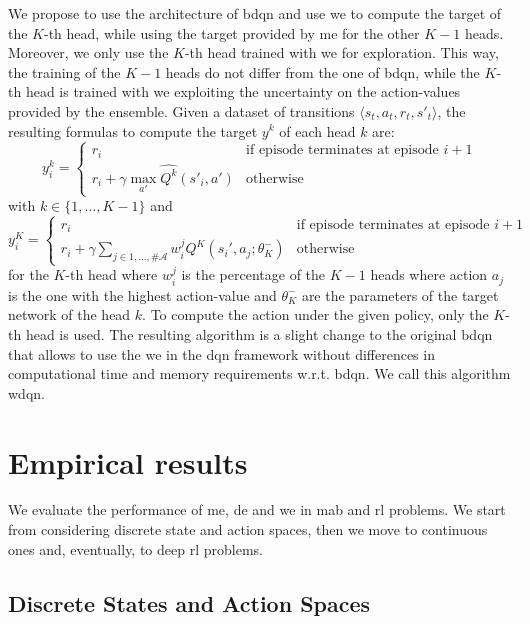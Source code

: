 We propose to use the architecture of \gls{bdqn} and use \gls{we} to compute the target of the $K$-th head, while using the target provided by \gls{me} for the other $K-1$ heads. Moreover, we only use the $K$-th head trained with \gls{we} for exploration. This way, the training of the $K-1$ heads do not differ from the one of \gls{bdqn}, while the $K$-th head is trained with \gls{we} exploiting the uncertainty on the action-values provided by the ensemble. Given a dataset of transitions $\langle s_t, a_t, r_t, s'_t \rangle$, the resulting formulas to compute the target $y^k$ of each head $k$ are:
\begin{equation}\label{E:dqn_update1}
y_i^k=
    \begin{cases}
    r_i & \text{if episode terminates at episode }i+1\\
    r_i + \gamma \max_{a'} \hat{Q^k}(s'_i, a') & \text{otherwise}
    \end{cases}
\end{equation}
with $k \in \lbrace 1, \dots, K-1 \rbrace$ and
\begin{equation}\label{E:dqn_update2}
y_i^K=
    \begin{cases}
    r_i & \text{if episode terminates at episode }i+1\\
    r_i + \gamma \sum_{j \in {1, \dots, \#\mathcal{A}}} w^j_i Q^K(s_i', a_j; \theta_K^-) & \text{otherwise}
    \end{cases}
\end{equation}
for the $K$-th head where $w^j_i$ is the percentage of the $K-1$ heads where action $a_j$ is the one with the highest action-value and $\theta_K^-$ are the parameters of the target network of the head $k$. To compute the action under the given policy, only the $K$-th head is used.
The resulting algorithm is a slight change to the original \gls{bdqn} that allows to use the \gls{we} in the \gls{dqn} framework without differences in computational time and memory requirements w.r.t. \gls{bdqn}. We call this algorithm \gls{wdqn}.

\section{Empirical results}
We evaluate the performance of \gls{me}, \gls{de} and \gls{we} in \gls{mab} and \gls{rl} problems. We start from considering discrete state and action spaces, then we move to continuous ones and, eventually, to deep \gls{rl} problems.

\subsection{Discrete States and Action Spaces}

